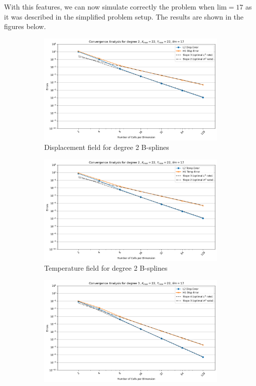 \documentclass[a4paper,12pt,twoside]{report}
\begin{document}
With this features, we can now simulate correctly the problem when $\text{lim} = 17$ as it was described in the simplified problem setup. The results are shown in the figures below.
\begin{figure}[!h]
	\begin{subfigure}[b]{0.49\textwidth}
		\includegraphics[width=\textwidth]{figures/figures_thermoelas_degree/Disp_X_max=22_Y_max=22_lim=17_d=2_disp.png}
		\caption{Displacement field for degree 2 B-splines}
		\label{fig:disp_d2_lim_17}
	\end{subfigure}
	\begin{subfigure}[b]{0.49\textwidth}
		\includegraphics[width=\textwidth]{figures/figures_thermoelas_degree/Temp_X_max=22_Y_max=22_lim=17_d=2.png}
		\caption{Temperature field for degree 2 B-splines}
		\label{fig:temp_d2_lim_17}
	\end{subfigure}
	\begin{subfigure}[b]{0.49\textwidth}
		\includegraphics[width=\textwidth]{figures/figures_thermoelas_degree/Disp_X_max=22_Y_max=22_lim=17_d=3_disp.png}

\end{subfigure}
\end{figure}
\end{document}

